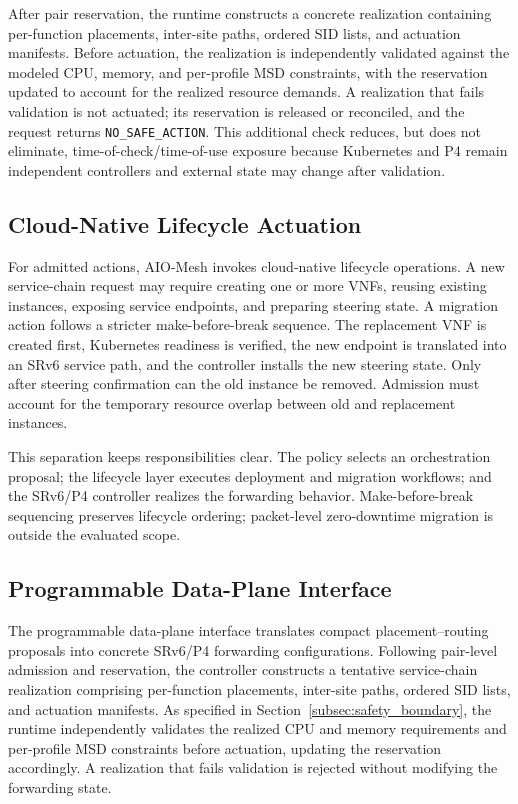 \documentclass[final,5p]{elsarticle}
\newcommand{\rev}[1]{\textcolor{BrickRed}{#1}}
\begin{document}
\rev{After pair reservation, the runtime constructs a concrete realization containing per-function placements, inter-site paths, ordered SID lists, and actuation manifests. Before actuation, the realization is independently validated against the modeled CPU, memory, and per-profile MSD constraints, with the reservation updated to account for the realized resource demands. A realization that fails validation is not actuated; its reservation is released or reconciled, and the request returns \texttt{NO\_SAFE\_ACTION}. This additional check reduces, but does not eliminate, time-of-check/time-of-use exposure because Kubernetes and P4 remain independent controllers and external state may change after validation.}

\subsection{Cloud-Native Lifecycle Actuation}
\label{subsec:cloud_native_actuation}

For admitted actions, AIO-Mesh invokes cloud-native lifecycle operations. A new service-chain request may require creating one or more VNFs, reusing existing instances, exposing service endpoints, and preparing steering state. A migration action follows a stricter make-before-break sequence. The replacement VNF is created first, Kubernetes readiness is verified, the new endpoint is translated into an \rev{SRv6 service path}, and the controller installs the new steering state. Only after steering confirmation can the old instance be removed. \rev{Admission must account for the temporary resource overlap between old and replacement instances.}

This separation keeps responsibilities clear. The policy selects an \rev{orchestration proposal}; the lifecycle layer executes deployment and migration workflows; and the SRv6/P4 controller realizes the forwarding behavior. \rev{Make-before-break sequencing preserves lifecycle ordering; packet-level zero-downtime migration is outside the evaluated scope.}

\subsection{Programmable Data-Plane Interface}
\label{subsec:data_plane_interface}
The programmable data-plane interface translates compact placement--routing proposals into concrete SRv6/P4 forwarding configurations. Following pair-level admission and reservation, the controller constructs a tentative service-chain realization comprising per-function placements, inter-site paths, ordered SID lists, and actuation manifests. As specified in Section~\ref{subsec:safety_boundary}, the runtime independently validates the realized CPU and memory requirements and per-profile MSD constraints before actuation, updating the reservation accordingly. A realization that fails validation is rejected without modifying the forwarding state.
\end{document}
